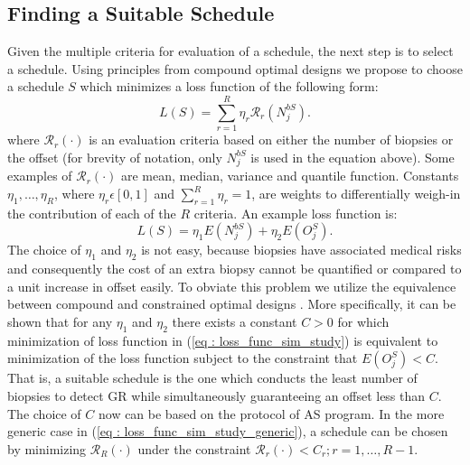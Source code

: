 \subsection{Finding a Suitable Schedule}
Given the multiple criteria for evaluation of a schedule, the next step is to select a schedule. Using principles from compound optimal designs \citep{lauter1976optimal} we propose to choose a schedule $S$ which minimizes a loss function of the following form:
\begin{equation}
\label{eq : loss_func_sim_study_generic}
L(S) = \sum_{r=1}^R \eta_r \mathcal{R}_r(N^{bS}_j).
\end{equation}
where $\mathcal{R}_r(\cdot)$ is an evaluation criteria based on either the number of biopsies or the offset (for brevity of notation, only $N^{bS}_j$ is used in the equation above). Some examples of $\mathcal{R}_r(\cdot)$ are mean, median, variance and quantile function. Constants $\eta_1, \ldots, \eta_R$, where $\eta_r \epsilon [0,1]$ and $\sum_{r=1}^R \eta_r = 1$, are weights to differentially weigh-in the contribution of each of the $R$ criteria. An example loss function is:
\begin{equation}
\label{eq : loss_func_sim_study}
L(S) = \eta_1 E(N^{bS}_j) + \eta_2 E(O^S_j). 
\end{equation}
The choice of $\eta_1$ and $\eta_2$ is not easy, because biopsies have associated medical risks and consequently the cost of an extra biopsy cannot be quantified or compared to a unit increase in offset easily. To obviate this problem we utilize the equivalence between compound and constrained optimal designs \citep{cook1994equivalence}. More specifically, it can be shown that for any $\eta_1$ and $\eta_2$ there exists a constant $C>0$ for which minimization of loss function in (\ref{eq : loss_func_sim_study}) is equivalent to minimization of the loss function subject to the constraint that $E(O^S_j) < C$. That is, a suitable schedule is the one which conducts the least number of biopsies to detect GR while simultaneously guaranteeing an offset less than $C$. The choice of $C$ now can be based on the protocol of AS program. In the more generic case in (\ref{eq : loss_func_sim_study_generic}), a schedule can be chosen by minimizing $\mathcal{R}_R(\cdot)$ under the constraint $\mathcal{R}_r(\cdot) < C_r; r=1, \ldots, R-1$.